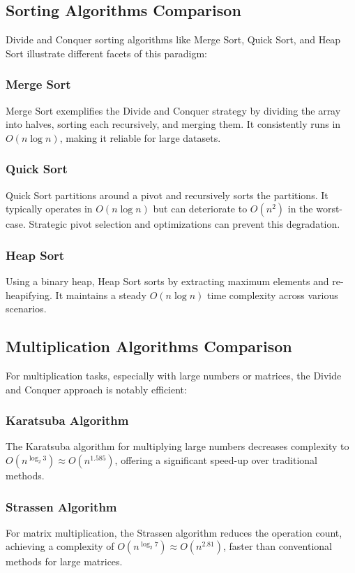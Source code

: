 \documentclass[12pt]{book} %
\begin{document}
\subsection{Sorting Algorithms Comparison}

Divide and Conquer sorting algorithms like Merge Sort, Quick Sort, and Heap Sort illustrate different facets of this paradigm:

\subsubsection{Merge Sort}
Merge Sort exemplifies the Divide and Conquer strategy by dividing the array into halves, sorting each recursively, and merging them. It consistently runs in \(O(n \log n)\), making it reliable for large datasets.

\subsubsection{Quick Sort}
Quick Sort partitions around a pivot and recursively sorts the partitions. It typically operates in \(O(n \log n)\) but can deteriorate to \(O(n^2)\) in the worst-case. Strategic pivot selection and optimizations can prevent this degradation.

\subsubsection{Heap Sort}
Using a binary heap, Heap Sort sorts by extracting maximum elements and re-heapifying. It maintains a steady \(O(n \log n)\) time complexity across various scenarios.

\subsection{Multiplication Algorithms Comparison}

For multiplication tasks, especially with large numbers or matrices, the Divide and Conquer approach is notably efficient:

\subsubsection{Karatsuba Algorithm}
The Karatsuba algorithm for multiplying large numbers decreases complexity to \(O(n^{\log_2 3}) \approx O(n^{1.585})\), offering a significant speed-up over traditional methods.

\subsubsection{Strassen Algorithm}
For matrix multiplication, the Strassen algorithm reduces the operation count, achieving a complexity of \(O(n^{\log_2 7}) \approx O(n^{2.81})\), faster than conventional methods for large matrices.
\end{document}
